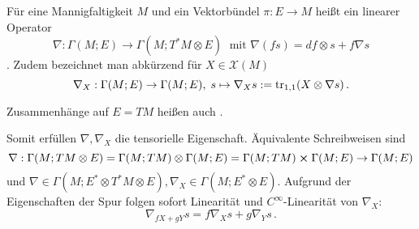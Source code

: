 \documentclass[../H_Analysis_main.tex]{subfiles}
\begin{document}



\begin{defi}[Zusammenhang]\label{defi:zsmhang}
Für eine Mannigfaltigkeit $M$ und ein Vektorbündel $\pi: E \rightarrow M$ heißt ein linearer Operator
\begin{equation}
\nabla: \Gamma(M; E) \rightarrow \Gamma(M; T^* M \otimes E) \; \text{ mit } \nabla(fs) = df \otimes s + f \nabla s
\end{equation}
. Zudem bezeichnet man abkürzend für $X \in \mathcal{X}(M)$
\begin{equation}
\nabla_X: \Gamma(M; E) \rightarrow \Gamma(M; E), \; s \mapsto \nabla_X s := \tr_{1, 1}(X \otimes \nabla s) \, .
\end{equation}

Zusammenhänge auf $E = TM$ heißen auch .
\end{defi}


Somit erfüllen $\nabla, \nabla_X$ die tensorielle Eigenschaft. Äquivalente Schreibweisen sind
\begin{equation*}
\nabla: \Gamma(M; TM \otimes E) = \Gamma(M; TM) \otimes \Gamma(M; E) = \Gamma(M; TM) \cross \Gamma(M; E) \rightarrow \Gamma(M; E)
\end{equation*}
und $\nabla \in \Gamma(M; E^* \otimes T^*M \otimes E), \nabla_X \in \Gamma(M; E^* \otimes E)$. Aufgrund der Eigenschaften der Spur folgen sofort Linearität und $C^\infty$-Linearität von $\nabla_X$:
\begin{equation}
\nabla_{f X + g Y} s = f \nabla_X s + g \nabla_Y s \, .
\end{equation}
\end{document}
